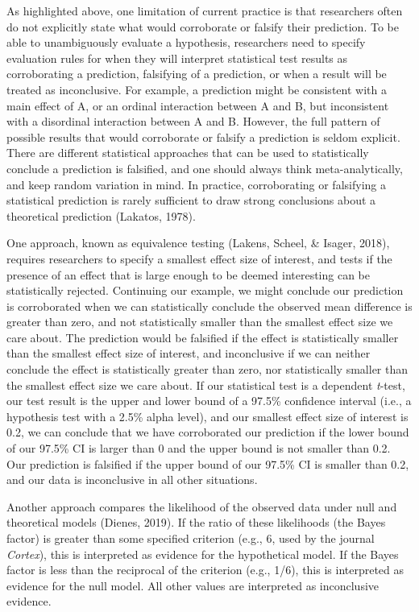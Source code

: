 \documentclass[english,doc,floatsintext]{apa6}
\begin{document}
As highlighted above, one limitation of current practice is that researchers often do not explicitly state what would corroborate or falsify their prediction. To be able to unambiguously evaluate a hypothesis, researchers need to specify evaluation rules for when they will interpret statistical test results as corroborating a prediction, falsifying of a prediction, or when a result will be treated as inconclusive. For example, a prediction might be consistent with a main effect of A, or an ordinal interaction between A and B, but inconsistent with a disordinal interaction between A and B. However, the full pattern of possible results that would corroborate or falsify a prediction is seldom explicit. There are different statistical approaches that can be used to statistically conclude a prediction is falsified, and one should always think meta-analytically, and keep random variation in mind. In practice, corroborating or falsifying a statistical prediction is rarely sufficient to draw strong conclusions about a theoretical prediction (Lakatos, 1978).

One approach, known as equivalence testing (Lakens, Scheel, \& Isager, 2018), requires researchers to specify a smallest effect size of interest, and tests if the presence of an effect that is large enough to be deemed interesting can be statistically rejected. Continuing our example, we might conclude our prediction is corroborated when we can statistically conclude the observed mean difference is greater than zero, and not statistically smaller than the smallest effect size we care about. The prediction would be falsified if the effect is statistically smaller than the smallest effect size of interest, and inconclusive if we can neither conclude the effect is statistically greater than zero, nor statistically smaller than the smallest effect size we care about. If our statistical test is a dependent \emph{t}-test, our test result is the upper and lower bound of a 97.5\% confidence interval (i.e., a hypothesis test with a 2.5\% alpha level), and our smallest effect size of interest is 0.2, we can conclude that we have corroborated our prediction if the lower bound of our 97.5\% CI is larger than 0 and the upper bound is not smaller than 0.2. Our prediction is falsified if the upper bound of our 97.5\% CI is smaller than 0.2, and our data is inconclusive in all other situations.

Another approach compares the likelihood of the observed data under null and theoretical models (Dienes, 2019). If the ratio of these likelihoods (the Bayes factor) is greater than some specified criterion (e.g., 6, used by the journal \emph{Cortex}), this is interpreted as evidence for the hypothetical model. If the Bayes factor is less than the reciprocal of the criterion (e.g., 1/6), this is interpreted as evidence for the null model. All other values are interpreted as inconclusive evidence.
\end{document}
